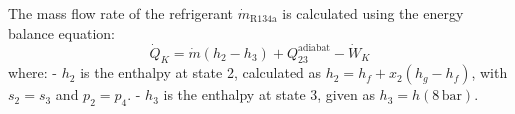 The mass flow rate of the refrigerant \( \dot{m}_{\text{R134a}} \) is calculated using the energy balance equation:  
\[
\dot{Q}_K = \dot{m} (h_2 - h_3) + Q_{23}^{\text{adiabat}} - \dot{W}_K
\]  
where:  
- \( h_2 \) is the enthalpy at state 2, calculated as \( h_2 = h_f + x_2 (h_g - h_f) \), with \( s_2 = s_3 \) and \( p_2 = p_4 \).  
- \( h_3 \) is the enthalpy at state 3, given as \( h_3 = h(8 \, \text{bar}) \).